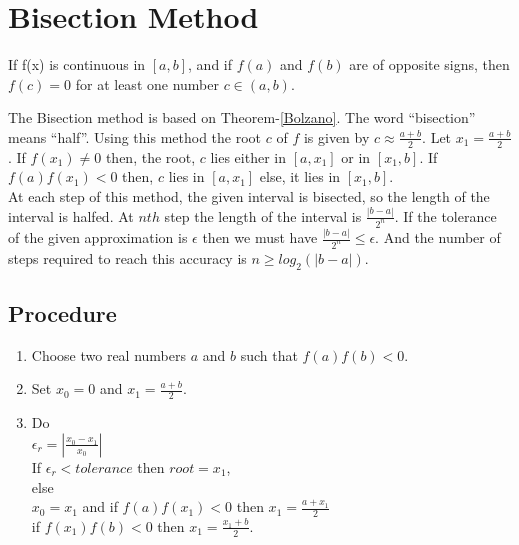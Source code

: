 \documentclass[aima203_lecturenotes_ku.tex]{subfiles}
\begin{document}
\section{Bisection Method}
\begin{mdframed}[style=myframe]
  \begin{theorem}
    \label{Bolzano}
  If f(x) is continuous in \([a,b]\), and if \(f(a)\) and \(f(b)\) are of opposite signs, then \(f(c)=0\) for at least one number \(c \in (a,b)\).
\end{theorem}
\end{mdframed}
The Bisection method is based on Theorem-\ref{Bolzano}. The word ``bisection'' means ``half''. Using this method the root \(c\) of \(f\) is given by \(\displaystyle c \approx \frac{a+b}{2}\). Let \(\displaystyle x_1=\frac{a+b}{2}\). If \(f(x_1) \neq 0\) then, the root, \(c\) lies either in \([a,x_1]\) or in \([x_1,b]\). If \(f(a)f(x_1) <0\) then, \(c\) lies in \([a,x_1]\) else, it lies in \([x_1,b]\). \\[4mm]
At each step of this method, the given interval is bisected, so the length of the interval is halfed. At \(nth\) step the length of the interval is \(\displaystyle \frac{|b-a|}{2^n}\). If the tolerance of the given approximation is \(\epsilon\) then we must have \(\displaystyle \frac{|b-a|}{2^n} \leq \epsilon\). And the number of steps required to reach this accuracy is \(\displaystyle n \geq {log_2(|b-a|)}\).

\subsection{Procedure}
\begin{enumerate}
\item Choose two real numbers \(a\) and \(b\) such that \(f(a)f(b) < 0\).
\item Set \(\displaystyle x_0 = 0\) and \(\displaystyle x_1= \frac{a+b}{2}\).
\item Do \\
  \(\displaystyle \epsilon_r = \left | \frac{x_0 -x_1}{x_0} \right |\) \\[1mm]
  If \(\epsilon_r < tolerance\) then \(root = x_1\), \\
  else\\
  \(x_0=x_1\) and if \(f(a)f(x_1) < 0\) then \(\displaystyle x_1= \frac{a+x_1}{2}\) \\
  if \(f(x_1)f(b) < 0\) then \(\displaystyle x_1= \frac{x_1+b}{2}\).
\end{enumerate}
\end{document}
